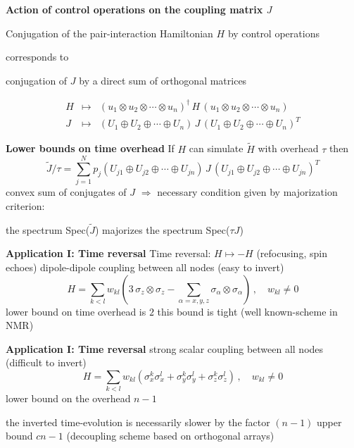 \documentclass[portrait]{seminar}
\begin{document}
\begin{slide}
{\large {\bf Action of control operations on the coupling matrix $J$}}
\vfill
\begin{center}
{\blue Conjugation of the pair-interaction Hamiltonian $H$ by control
operations}

corresponds to

{\blue conjugation of $J$ by a direct sum of orthogonal matrices}
\end{center}
\[
\begin{array}{ccc}
H & \mapsto & (u_1\otimes u_2\otimes\cdots\otimes u_n)^\dagger\, H\, 
(u_1\otimes u_2\otimes\cdots\otimes u_n) \\
J & \mapsto & (U_1\oplus U_2\oplus\cdots\oplus U_n)\, J\,
(U_1\oplus U_2\oplus\cdots\oplus U_n)^T
\end{array}
\]
\vfill
\end{slide}

\begin{slide}
{\large {\bf Lower bounds on time overhead}}
\vfill
If $H$ can simulate $\tilde{H}$ with overhead $\tau$ then
\[
\tilde{J}/\tau = \sum_{j=1}^N p_j 
(U_{j1}\oplus U_{j2}\oplus\cdots\oplus U_{jn})
\,J\, (U_{j1}\oplus U_{j2}\oplus\cdots\oplus U_{jn})^T
\]
convex sum of conjugates of $J$
\vfill
$\Rightarrow$ necessary condition given by {\blue majorization criterion}:\\
\begin{center}
the spectrum Spec($\tilde{J}$) majorizes the spectrum Spec($\tau J$)
\end{center}
\vfill
\end{slide}


\begin{slide}
{\large {\bf Application I: Time reversal}}
\vfill
Time reversal: $H \mapsto -H$ (refocusing, spin echoes)
\vfill
dipole-dipole coupling between all nodes (easy to invert)
\[
H=\sum_{k<l} w_{kl} (3\,\sigma_z\otimes\sigma_z - \sum_{\alpha=x,y,z} 
\sigma_\alpha\otimes\sigma_\alpha)\,,\quad w_{kl}\neq 0
\]
\vfill
lower bound on time overhead is $2$
\vfill
this bound is tight (well known-scheme in NMR)
\vfill
\end{slide}


\begin{slide}
{\large {\bf Application I: Time reversal}}
\vfill
strong scalar coupling between all nodes (difficult to invert)
\[
H = \sum_{k<l} w_{kl}
(\sigma_x^k\sigma_x^l + \sigma_y^k\sigma_y^l + \sigma_z^k\sigma_z^l)\,,\quad
w_{kl}\neq 0
\]
\vfill
lower bound on the overhead $n-1$

the inverted time-evolution is necessarily slower by the factor $(n-1)$
\vfill
upper bound $cn-1$ (decoupling scheme based on orthogonal arrays)
\vfill
\end{slide}
\end{document}
